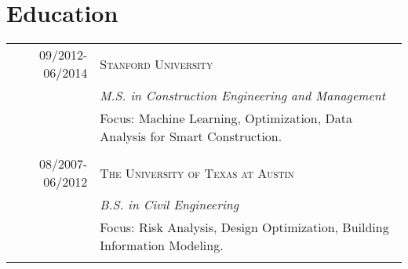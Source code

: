 \documentclass[a4paper,10pt]{article}
\begin{document}
\begin{tabularx}{\textwidth}{r|X}


\end{tabularx}




\section{Education}
\begin{tabularx}{\textwidth}{r|X}	
 \textsc{09/2012-06/2014} & \textsc{Stanford University} \\ 
& \emph{M.S. in Construction Engineering and Management} \\&\footnotesize{Focus: Machine Learning, Optimization, Data Analysis for Smart Construction.}\\\multicolumn{2}{c}{} \\

\textsc{08/2007-06/2012} & \textsc{The University of Texas at Austin}\\
& \emph{B.S. in Civil Engineering} \\&\footnotesize{Focus: Risk Analysis, Design Optimization, Building Information Modeling.}\\\multicolumn{2}{c}{} \\
\end{tabularx}













\end{document}
